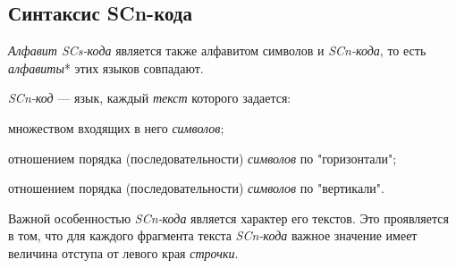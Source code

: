 \subsection{Синтаксис SCn-кода}
\label{sec_scn_syntax}

\textit{Алфавит SCs-кода\scnsupergroupsign} является также алфавитом символов и \textit{SCn-кода}, то есть \textit{алфавиты}* этих языков совпадают.

\textit{SCn-код} --- язык, каждый \textit{текст} которого задается:
\begin{textitemize}
	\item множеством входящих в него \textit{символов};
	\item отношением порядка (последовательности) \textit{символов} по "горизонтали"{};
	\item отношением порядка (последовательности) \textit{символов} по "вертикали"{}.
\end{textitemize}

\begin{SCn}
\end{SCn}

Важной особенностью \textit{SCn-кода} является  характер его текстов. Это проявляется в том, что для каждого фрагмента текста \textit{SCn-кода} важное значение имеет величина отступа от левого края \textit{строчки}.

